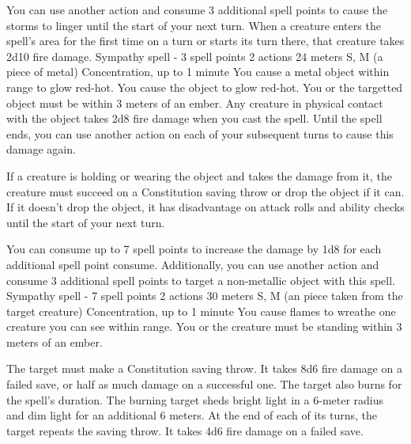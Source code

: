         You can use another action and consume 3 additional spell points to cause the storms to linger until the start of your next turn.
        When a creature enters the spell's area for the first time on a turn or starts its turn there, that creature takes 2d10 fire damage.
        {Sympathy spell - 3 spell points}
        {2 actions}
        {24 meters}
        {S, M (a piece of metal)}
        {Concentration, up to 1 minute}
        You cause a metal object within range to glow red-hot.
        You cause the object to glow red-hot.
        You or the targetted object must be within 3 meters of an ember.
        Any creature in physical contact with the object takes 2d8 fire damage when you cast the spell.
        Until the spell ends, you can use another action on each of your subsequent turns to cause this damage again.

        If a creature is holding or wearing the object and takes the damage from it, the creature must succeed on a Constitution saving throw or drop the object if it can.
        If it doesn't drop the object, it has disadvantage on attack rolls and ability checks until the start of your next turn.

        You can consume up to 7 spell points to increase the damage by 1d8 for each additional spell point consume.
        Additionally, you can use another action and consume 3 additional spell points to target a non-metallic object with this spell.
        {Sympathy spell - 7 spell points}
        {2 actions}
        {30 meters}
        {S, M (an piece taken from the target creature)}
        {Concentration, up to 1 minute}
        You cause flames to wreathe one creature you can see within range.
        You or the creature must be standing within 3 meters of an ember.

        The target must make a Constitution saving throw.
        It takes 8d6 fire damage on a failed save, or half as much damage on a successful one.
        The target also burns for the spell's duration.
        The burning target sheds bright light in a 6-meter radius and dim light for an additional 6 meters.
        At the end of each of its turns, the target repeats the saving throw.
        It takes 4d6 fire damage on a failed save.

